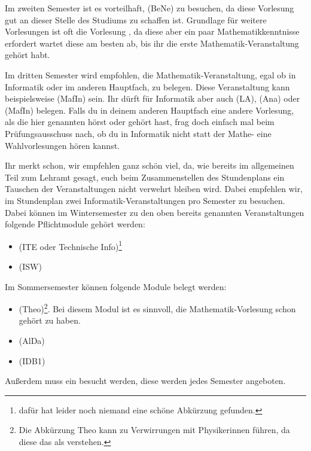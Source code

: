 Im zweiten Semester ist es vorteilhaft,  (\gls{BeNe}) zu besuchen, da diese Vorlesung gut an dieser Stelle des Studiums zu schaffen ist. Grundlage für weitere Vorlesungen ist oft die Vorlesung , da diese aber ein paar Mathematikkenntnisse erfordert wartet diese am besten ab, bis ihr die erste Mathematik-Veranstaltung gehört habt.

Im dritten Semester wird empfohlen, die Mathematik-Veranstaltung, egal ob in Informatik oder im anderen Hauptfach, zu belegen. Diese Veranstaltung kann beispielsweise  (\gls{MafIn}) sein. Ihr dürft für Informatik aber auch  (\gls{LA}), (\gls{Ana}) oder  (\gls{MafIn}) belegen. Falls du in deinem anderen Hauptfach eine andere Vorlesung, als die hier genannten hörst oder gehört hast, frag doch einfach mal beim Prüfungsausschuss nach, ob du in Informatik nicht statt der Mathe- eine Wahlvorlesungen hören kannst.

Ihr merkt schon, wir empfehlen ganz schön viel, da, wie bereits im allgemeinen Teil zum Lehramt gesagt, euch beim Zusammenstellen des Stundenplans ein Tauschen der Veranstaltungen nicht verwehrt bleiben wird. Dabei empfehlen wir, im Stundenplan zwei Informatik-Veranstaltungen pro Semester zu besuchen. Dabei können im Wintersemester zu den oben bereits genannten Veranstaltungen folgende Pflichtmodule gehört werden:
\begin{itemize}
    \item {} (\gls{ITE} oder Technische Info)\footnote{dafür hat leider noch niemand eine schöne Abkürzung gefunden.}
    \item {} (\gls{ISW})
\end{itemize}
Im Sommersemester können folgende Module belegt werden:
\begin{itemize}
    \item {} (\gls{Theo})\footnote{Die Abkürzung \glqq{}Theo\grqq{} kann zu Verwirrungen mit Physikerinnen führen, da diese das als  verstehen.}. Bei diesem Modul ist es sinnvoll, die Mathematik-Vorlesung schon gehört zu haben.
    \item {} (\gls{AlDa})
    \item {} (\gls{IDB1})
\end{itemize}
Außerdem muss ein  besucht werden, diese werden jedes Semester angeboten.

